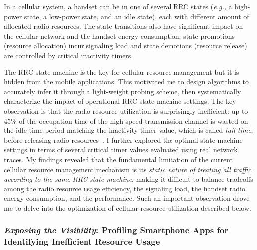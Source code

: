 \documentclass[10pt]{article}
\newcommand{\eg}{\emph{e.g.,}\xspace}
\begin{document}
\begin{small}
In a cellular system, a handset can be in one of several RRC states (\eg a high-power state, a low-power state, and an idle state), each with different amount of allocated radio resources. The state transitions also have significant impact on the cellular network and the handset energy consumption: state promotions (resource allocation) incur signaling load and state demotions (resource release) are controlled by critical inactivity timers.

The RRC state machine is the key for cellular resource management but it is hidden from the mobile applications. This motivated me to design algorithms to accurately infer it through a light-weight probing scheme, then
systematically characterize the impact of operational RRC state machine settings.
The key observation is that the radio resource utilization is surprisingly inefficient: up to 45\% of the occupation time of the high-speed transmission channel is wasted on the idle time period matching the inactivity timer value, which is called \emph{tail time}, before releasing radio resources~\cite{qian10_imc}. I further explored the optimal state machine settings in terms of several critical timer values evaluated using real network traces. My findings revealed that the fundamental limitation of the current cellular resource management mechanism is its \emph{static nature of treating all traffic according to the same RRC state machine}, making it difficult to balance tradeoffs among the radio resource usage efficiency, the signaling load, the handset radio energy consumption, and the performance. Such an important observation drove me to delve into the optimization of cellular resource utilization described below.



\subsubsection*{\emph{Exposing the Visibility}: Profiling Smartphone Apps for Identifying Inefficient Resource Usage}



\end{small}
\end{document}
